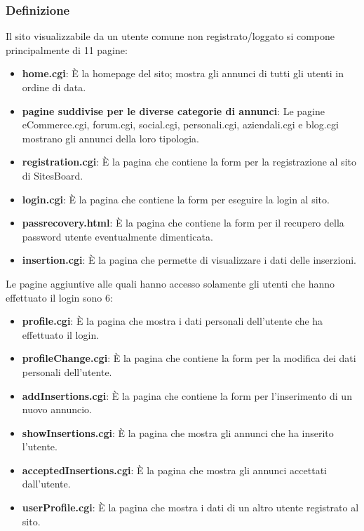 \documentclass[12pt]{article}
\begin{document}
		\subsubsection{Definizione}
	
		Il sito visualizzabile da un utente comune non registrato/loggato si compone principalmente di 11 pagine:
		
		\begin{itemize}
			\item \textbf{home.cgi}: È la homepage del sito; mostra gli annunci di tutti gli utenti in ordine di data.
			\item \textbf{pagine suddivise per le diverse categorie di annunci}: Le pagine eCommerce.cgi, forum.cgi, social.cgi, personali.cgi, aziendali.cgi e blog.cgi mostrano gli annunci della loro tipologia.
			\item \textbf{registration.cgi}: È la pagina che contiene la form per la registrazione al sito di SitesBoard.
			\item \textbf{login.cgi}: È la pagina che contiene la form per eseguire la login al sito.
			\item \textbf{pass\textunderscore recovery.html}: È la pagina che contiene la form per il recupero della password utente eventualmente dimenticata.\\
			\item \textbf{insertion.cgi}: È la pagina che permette di visualizzare i dati delle inserzioni.
		\end{itemize}
		
		Le pagine aggiuntive alle quali hanno accesso solamente gli utenti che hanno effettuato il login sono 6:
		
		\begin{itemize}
			\item \textbf{profile.cgi}: È la pagina che mostra i dati personali dell'utente che ha effettuato il login.
			\item \textbf{profileChange.cgi}: È la pagina che contiene la form per la modifica dei dati personali dell'utente.
			\item \textbf{addInsertions.cgi}: È la pagina che contiene la form per l'inserimento di un nuovo annuncio.
			\item \textbf{showInsertions.cgi}: È la pagina che mostra gli annunci che ha inserito l'utente.
			\item \textbf{acceptedInsertions.cgi}: È la pagina che mostra gli annunci accettati dall'utente.
			\item \textbf{userProfile.cgi}: È la pagina che mostra i dati di un altro utente registrato al sito.
		\end{itemize}
		
\end{document}
